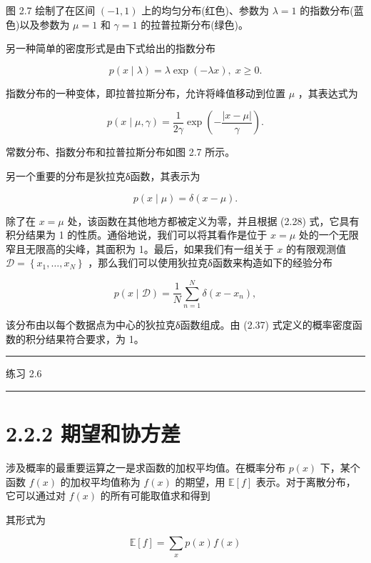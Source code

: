 \documentclass[10pt]{report}
\newcommand{\HRule}{\begin{center}\rule{0.9\linewidth}{0.2mm}\end{center}}
\begin{document}
图 2.7 绘制了在区间 \(\left( {-1,1}\right)\) 上的均匀分布(红色)、参数为 \(\lambda  = 1\) 的指数分布(蓝色)以及参数为 \(\mu  = 1\) 和 \(\gamma  = 1\) 的拉普拉斯分布(绿色)。

另一种简单的密度形式是由下式给出的指数分布

\[
p\left( {x \mid  \lambda }\right)  = \lambda \exp \left( {-{\lambda x}}\right) ,\;x \geq  0. \tag{2.34}
\]

指数分布的一种变体，即拉普拉斯分布，允许将峰值移动到位置 \(\mu\) ，其表达式为

\[
p\left( {x \mid  \mu ,\gamma }\right)  = \frac{1}{2\gamma }\exp \left( {-\frac{\left| x - \mu \right| }{\gamma }}\right) . \tag{2.35}
\]

常数分布、指数分布和拉普拉斯分布如图 2.7 所示。

另一个重要的分布是狄拉克δ函数，其表示为

\[
p\left( {x \mid  \mu }\right)  = \delta \left( {x - \mu }\right) . \tag{2.36}
\]

除了在 \(x = \mu\) 处，该函数在其他地方都被定义为零，并且根据 (2.28) 式，它具有积分结果为 1 的性质。通俗地说，我们可以将其看作是位于 \(x = \mu\) 处的一个无限窄且无限高的尖峰，其面积为 1。最后，如果我们有一组关于 \(x\) 的有限观测值 \(\mathcal{D} = \left\{  {{x}_{1},\ldots ,{x}_{N}}\right\}\) ，那么我们可以使用狄拉克δ函数来构造如下的经验分布

\[
p\left( {x \mid  \mathcal{D}}\right)  = \frac{1}{N}\mathop{\sum }\limits_{{n = 1}}^{N}\delta \left( {x - {x}_{n}}\right) , \tag{2.37}
\]

该分布由以每个数据点为中心的狄拉克δ函数组成。由 (2.37) 式定义的概率密度函数的积分结果符合要求，为 1。

\HRule

练习 2.6

\HRule

\section*{2.2.2 期望和协方差}

涉及概率的最重要运算之一是求函数的加权平均值。在概率分布 \(p\left( x\right)\) 下，某个函数 \(f\left( x\right)\) 的加权平均值称为 \(f\left( x\right)\) 的期望，用 \(\mathbb{E}\left\lbrack  f\right\rbrack\) 表示。对于离散分布，它可以通过对 \(f\left( x\right)\) 的所有可能取值求和得到

其形式为

\[
\mathbb{E}\left\lbrack  f\right\rbrack   = \mathop{\sum }\limits_{x}p\left( x\right) f\left( x\right)  \tag{2.38}
\]
\end{document}
